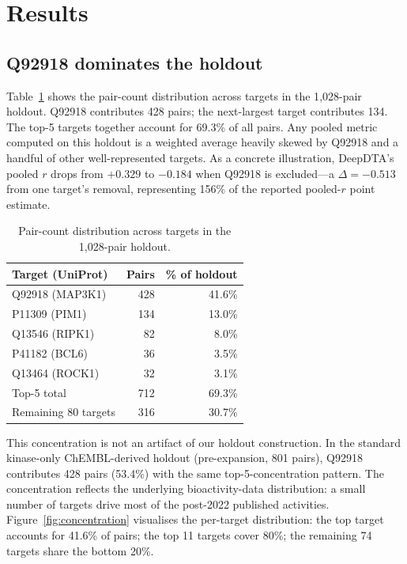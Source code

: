 \documentclass[11pt,a4paper]{article}
\begin{document}
\section{Results}

\subsection{Q92918 dominates the holdout}
\label{sec:q92918}

Table~\ref{tab:concentration} shows the pair-count distribution across targets
in the 1{,}028-pair holdout.
Q92918 contributes 428 pairs; the next-largest target contributes 134.
The top-5 targets together account for 69.3\% of all pairs.
Any pooled metric computed on this holdout is a weighted average heavily
skewed by Q92918 and a handful of other well-represented targets.
As a concrete illustration, DeepDTA's pooled $r$ drops from $+0.329$ to
$-0.184$ when Q92918 is excluded---a $\Delta = -0.513$ from one target's
removal, representing 156\% of the reported pooled-$r$ point estimate.

\begin{table}[h]
\centering
\caption{Pair-count distribution across targets in the 1{,}028-pair holdout.}
\label{tab:concentration}
\begin{tabular}{lrr}
\toprule
\textbf{Target (UniProt)} & \textbf{Pairs} & \textbf{\% of holdout} \\
\midrule
Q92918 (MAP3K1)   & 428 & 41.6\% \\
P11309 (PIM1)     & 134 & 13.0\% \\
Q13546 (RIPK1)    &  82 &  8.0\% \\
P41182 (BCL6)     &  36 &  3.5\% \\
Q13464 (ROCK1)    &  32 &  3.1\% \\
\midrule
Top-5 total       & 712 & 69.3\% \\
Remaining 80 targets & 316 & 30.7\% \\
\bottomrule
\end{tabular}
\end{table}

This concentration is not an artifact of our holdout construction.
In the standard kinase-only ChEMBL-derived holdout (pre-expansion, 801 pairs),
Q92918 contributes 428 pairs (53.4\%) with the same top-5-concentration pattern.
The concentration reflects the underlying bioactivity-data distribution: a small
number of targets drive most of the post-2022 published activities.
Figure~\ref{fig:concentration} visualises the per-target distribution: the top
target accounts for 41.6\% of pairs; the top 11 targets cover 80\%; the
remaining 74 targets share the bottom 20\%.
\end{document}
